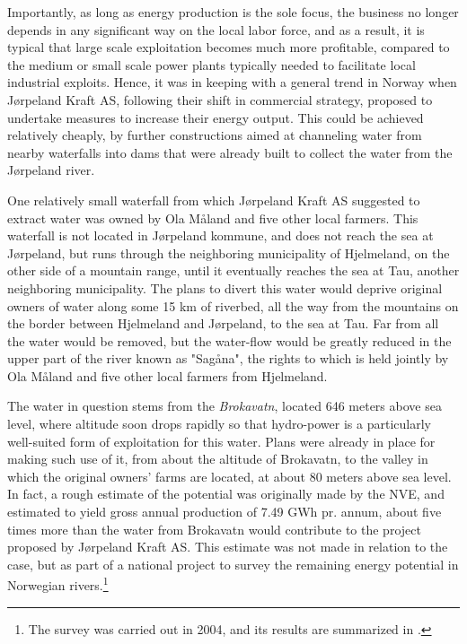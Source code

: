 Importantly, as long as energy production is the sole focus, the business no longer depends in any significant way on the local labor force, and as a result, it is typical that large scale exploitation becomes much more profitable, compared to the medium or small scale power plants typically needed to facilitate local industrial exploits. Hence, it was in keeping with a general trend in Norway when Jørpeland Kraft AS, following their shift in commercial strategy, proposed to undertake measures to increase their energy output. This could be achieved relatively cheaply, by further constructions aimed at channeling water from nearby waterfalls into dams that were already built to collect the water from the Jørpeland river.

One relatively small waterfall from which Jørpeland Kraft AS suggested to extract water was owned by Ola Måland and five other local farmers. This waterfall is not located in Jørpeland kommune, and does not reach the sea at Jørpeland, but runs through the neighboring municipality of Hjelmeland, on the other side of a mountain range, until it eventually reaches the sea at Tau, another neighboring municipality. The plans to divert this water would deprive original owners of water along some 15 km of riverbed, all the way from the mountains on the border between Hjelmeland and Jørpeland, to the sea at Tau. Far from all the water would be removed, but the water-flow would be greatly reduced in the upper part of the river known as "Sagåna", the rights to which is held jointly by Ola Måland and five other local farmers from Hjelmeland. 

The water in question stems from the \emph{Brokavatn}, located 646 meters above sea level, where altitude soon drops rapidly so that hydro-power is a particularly well-suited form of exploitation for this water. Plans were already in place for making such use of it, from about the altitude of Brokavatn, to the valley in which the original owners' farms are located, at about 80 meters above sea level. In fact, a rough estimate of the potential was originally made by the NVE, and estimated to yield gross annual production of 7.49 GWh pr. annum, about five times more than the water from Brokavatn would contribute to the project proposed by Jørpeland Kraft AS. This estimate was not made in relation to the case, but as part of a national project to survey the remaining energy potential in Norwegian rivers.\footnote{The survey was carried out in 2004, and its results are summarized in \cite{kartlegging}.}  

